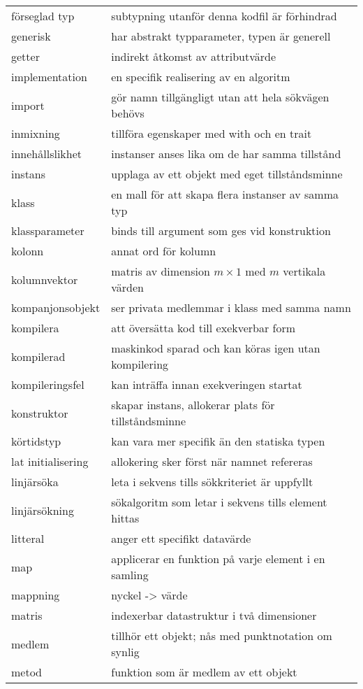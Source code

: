 \begin{tabular}{l|l}
förseglad typ & subtypning utanför denna kodfil är förhindrad \\
generisk & har abstrakt typparameter, typen är generell \\
getter & indirekt åtkomst av attributvärde \\
implementation & en specifik realisering av en algoritm \\
import & gör namn tillgängligt utan att hela sökvägen behövs \\
inmixning & tillföra egenskaper med with och en trait \\
innehållslikhet & instanser anses lika om de har samma tillstånd \\
instans & upplaga av ett objekt med eget tillståndsminne \\
klass & en mall för att skapa flera instanser av samma typ \\
klassparameter & binds till argument som ges vid konstruktion \\
kolonn & annat ord för kolumn \\
kolumnvektor & matris av dimension $m\times{}1$ med $m$ vertikala värden \\
kompanjonsobjekt & ser privata medlemmar i klass med samma namn \\
kompilera & att översätta kod till exekverbar form \\
kompilerad & maskinkod sparad och kan köras igen utan kompilering \\
kompileringsfel & kan inträffa innan exekveringen startat \\
konstruktor & skapar instans, allokerar plats för tillståndsminne \\
körtidstyp & kan vara mer specifik än den statiska typen \\
lat initialisering & allokering sker först när namnet refereras \\
linjärsöka & leta i sekvens tills sökkriteriet är uppfyllt \\
linjärsökning & sökalgoritm som letar i sekvens tills element hittas \\
litteral & anger ett specifikt datavärde \\
map & applicerar en funktion på varje element i en samling \\
mappning & nyckel -> värde \\
matris & indexerbar datastruktur i två dimensioner \\
medlem & tillhör ett objekt; nås med punktnotation om synlig \\
metod & funktion som är medlem av ett objekt \\

\end{tabular}
